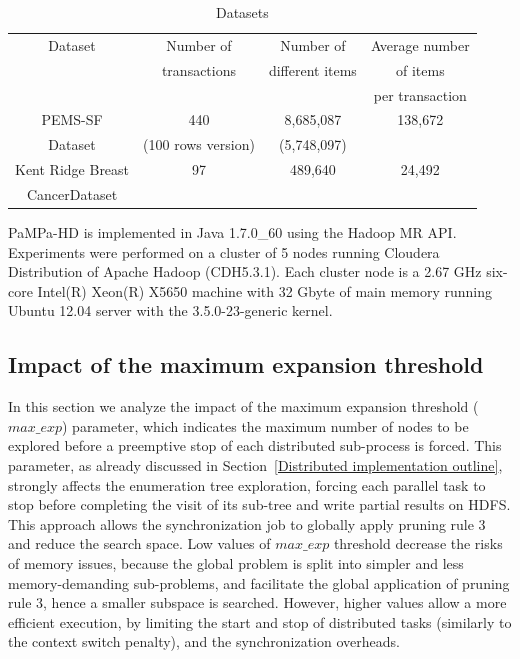 \begin{table}[h!]
\begin{center}
\caption{Datasets}
\label{datasets}
\begin{tabular}{|c|c|c|c|}
\hline
	Dataset & Number of  & Number of & Average number  \\
	 & transactions &different items & of items  \\ 
	  &  & &  per transaction  \\ \hline
	
PEMS-SF    & 440& 8,685,087     & 138,672 \\
     Dataset      & (100 rows version)   &   (5,748,097)       &  \\ \hline
     Kent Ridge Breast    & 97 & 489,640    & 24,492 \\
     CancerDataset      &    &            &  \\ \hline
\end{tabular}
\end{center}
\end{table}


PaMPa-HD is implemented in Java 1.7.0\_60 using the Hadoop MR API.
Experiments were performed on a cluster of 5 nodes running Cloudera
Distribution of Apache Hadoop (CDH5.3.1).
Each cluster node is a 2.67 GHz six-core Intel(R) Xeon(R) X5650 machine
with 32 Gbyte of main memory
running Ubuntu 12.04 server with the 3.5.0-23-generic kernel.


\subsection{Impact of the maximum expansion threshold}\label{exp_fisso}
In this section we analyze the impact of the maximum expansion threshold
($max\_exp$) parameter, which indicates the maximum number of nodes 
to be explored before a preemptive stop of each distributed sub-process is forced.
This parameter, as already discussed in Section~\ref{Distributed implementation outline},
strongly affects the enumeration tree exploration,
forcing each parallel task to stop before completing the visit of its sub-tree 
and write partial results on HDFS. 
This approach allows the synchronization job to globally apply 
pruning rule 3 and reduce the search space.
Low values of $max\_exp$ threshold decrease the risks of memory issues, 
because the global problem is split into simpler and less memory-demanding
sub-problems, and facilitate the global application of pruning rule 3, 
hence a smaller subspace is searched.
However, higher values allow a more efficient execution,
by limiting the start and stop of distributed tasks
(similarly to the context switch penalty), and the synchronization overheads.


